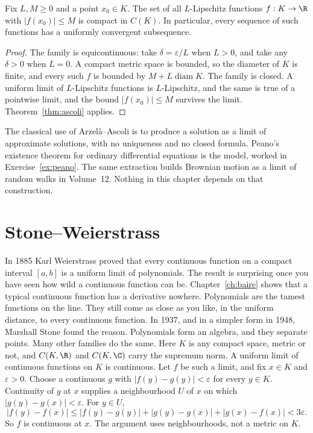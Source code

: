 \begin{corollary}\label{cor:lipcompact}
Fix $L,M\ge0$ and a point $x_0\in K$. The set of all $L$-Lipschitz functions $f:K\to\R$ with $|f(x_0)|\le M$ is compact in $C(K)$. In particular, every sequence of such functions has a uniformly convergent subsequence.
\end{corollary}
\begin{proof}
The family is equicontinuous: take $\delta=\varepsilon/L$ when $L>0$, and take any $\delta>0$ when $L=0$. A compact metric space is bounded, so the diameter of $K$ is finite, and every such $f$ is bounded by $M+L\operatorname{diam} K$. The family is closed. A uniform limit of $L$-Lipschitz functions is $L$-Lipschitz, and the same is true of a pointwise limit, and the bound $|f(x_0)|\le M$ survives the limit. Theorem~\ref{thm:ascoli} applies.
\end{proof}

The classical use of Arzel\`a--Ascoli is to produce a solution as a limit of approximate solutions, with no uniqueness and no closed formula. Peano's existence theorem for ordinary differential equations is the model, worked in Exercise~\ref{ex:peano}. The same extraction builds Brownian motion as a limit of random walks in Volume~12. Nothing in this chapter depends on that construction.

\section{Stone--Weierstrass}

In 1885 Karl Weierstrass proved that every continuous function on a compact interval $[a,b]$ is a uniform limit of polynomials. The result is surprising once you have seen how wild a continuous function can be. Chapter~\ref{ch:baire} shows that a typical continuous function has a derivative nowhere. Polynomials are the tamest functions on the line. They still come as close as you like, in the uniform distance, to every continuous function. In 1937, and in a simpler form in 1948, Marshall Stone found the reason. Polynomials form an algebra, and they separate points. Many other families do the same. Here $K$ is any compact space, metric or not, and $C(K,\R)$ and $C(K,\C)$ carry the supremum norm. A uniform limit of continuous functions on $K$ is continuous. Let $f$ be such a limit, and fix $x\in K$ and $\varepsilon>0$. Choose a continuous $g$ with $|f(y)-g(y)|<\varepsilon$ for every $y\in K$. Continuity of $g$ at $x$ supplies a neighbourhood $U$ of $x$ on which $|g(y)-g(x)|<\varepsilon$. For $y\in U$,
\[
|f(y)-f(x)|\le|f(y)-g(y)|+|g(y)-g(x)|+|g(x)-f(x)|<3\varepsilon.
\]
So $f$ is continuous at $x$. The argument uses neighbourhoods, not a metric on $K$.

